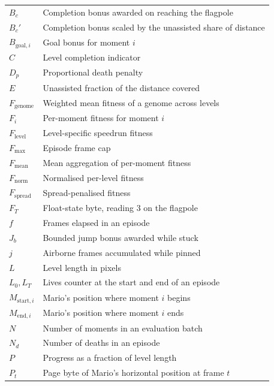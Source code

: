 \begin{longtable}{@{}p{}p{}@{}}
$B_{c}$              & Completion bonus awarded on reaching the flagpole \\
$B_{c}'$             & Completion bonus scaled by the unassisted share of distance \\
$B_{\text{goal},i}$  & Goal bonus for moment $i$ \\
$C$                  & Level completion indicator \\
$D_{p}$              & Proportional death penalty \\
$E$                  & Unassisted fraction of the distance covered \\
$F_{\text{genome}}$  & Weighted mean fitness of a genome across levels \\
$F_{i}$              & Per-moment fitness for moment $i$ \\
$F_{\text{level}}$   & Level-specific speedrun fitness \\
$F_{\max}$           & Episode frame cap \\
$F_{\text{mean}}$    & Mean aggregation of per-moment fitness \\
$F_{\text{norm}}$    & Normalised per-level fitness \\
$F_{\text{spread}}$  & Spread-penalised fitness \\
$F_{T}$              & Float-state byte, reading 3 on the flagpole \\
$f$                  & Frames elapsed in an episode \\
$J_{b}$              & Bounded jump bonus awarded while stuck \\
$j$                  & Airborne frames accumulated while pinned \\
$L$                  & Level length in pixels \\
$L_{0}, L_{T}$       & Lives counter at the start and end of an episode \\
$M_{\text{start},i}$ & Mario's position where moment $i$ begins \\
$M_{\text{end},i}$   & Mario's position where moment $i$ ends \\
$N$                  & Number of moments in an evaluation batch \\
$N_{d}$              & Number of deaths in an episode \\
$P$                  & Progress as a fraction of level length \\
$P_{t}$              & Page byte of Mario's horizontal position at frame $t$ \\

\end{longtable}
